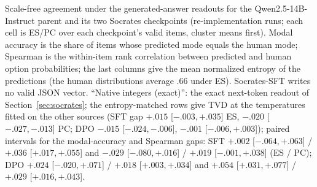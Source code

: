 \begin{table}[t]
\caption{Scale-free agreement under the generated-answer readouts for the Qwen2.5-14B-Instruct parent and its two Socrates checkpoints (re-implementation runs; each cell is ES/PC over each checkpoint's valid items, cluster means first). Modal accuracy is the share of items whose predicted mode equals the human mode; Spearman is the within-item rank correlation between predicted and human option probabilities; the last columns give the mean normalized entropy of the predictions (the human distributions average .66 under ES). Socrates-SFT writes no valid JSON vector. ``Native integers (exact)'': the exact next-token readout of Section~\ref{sec:socrates}; the entropy-matched rows give TVD at the temperatures fitted on the other sources (SFT gap $+.015$ [$-.003,+.035$] ES, $-.020$ [$-.027,-.013$] PC; DPO $-.015$ [$-.024,-.006$], $-.001$ [$-.006,+.003$]); paired intervals for the modal-accuracy and Spearman gaps: SFT $+.002$ [$-.064,+.063$] / $+.036$ [$+.017,+.055$] and $-.029$ [$-.080,+.016$] / $+.019$ [$-.001,+.038$] (ES / PC); DPO $+.024$ [$-.020,+.071$] / $+.018$ [$+.003,+.034$] and $+.054$ [$+.031,+.077$] / $+.029$ [$+.016,+.043$].}
\label{tab:native-scalefree}
\end{table}
